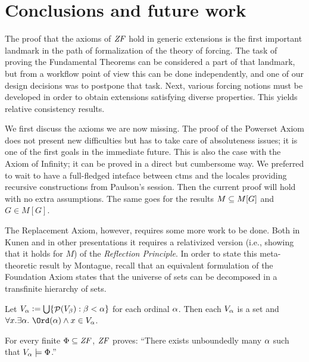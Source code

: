 \section{Conclusions and future work}
\label{sec:conclusions-future-work}

The proof that the axioms of $\mathit{ZF}$ hold in generic extensions is 
the first important landmark in the path of formalization of the
theory of forcing. The task of proving the Fundamental Theorems can be
considered a part of that landmark, but from a workflow point of view
this can be done independently, and one of our design decisions was to
postpone that task.  Next, various forcing notions must be developed
in order to obtain extensions satisfying diverse properties. This
yields relative consistency results.

We first discuss the axioms we are now missing. The proof of the
Powerset Axiom does not present new difficulties but  has to
take care of absoluteness issues; it is one of the
first goals in the immediate future. This is also the case with the
Axiom of Infinity; it can be proved in a direct but cumbersome way. We
preferred to wait to have a full-fledged inteface between ctms and the
locales providing recursive constructions from Paulson's
 session. Then the current proof will hold
with no extra assumptions. The same goes for the results $M\subseteq M[G]$
and $G\in M[G]$.

The Replacement Axiom, however, requires some more work to be
done. Both in Kunen and in other presentations \cite{neeman-course}
it requires a relativized version (i.e., showing that it holds for $M$) of
the \emph{Reflection Principle}. In order to state this meta-theoretic
result by Montague, recall that
an equivalent formulation of the Foundation Axiom states that the 
universe of sets can be decomposed in a transfinite hierarchy of
sets. 
\begin{theorem}
  Let $V_{\alpha}\mathrel{\mathop:}=\mathop{\textstyle\bigcup}\{\mathop{\mathcal{P}}(V_\beta) : \beta<\alpha\}$ for each ordinal
  $\alpha$. Then each $V_\alpha$ is a set and 
  $\forall x. \exists\al .\ \Ord(\al) \y x\in V_\al$.  
\end{theorem}
\begin{theorem}\label{th:reflection-principle}
  For every finite $\Phi\subseteq\mathit{ZF}$, $\mathit{ZF}$ proves: ``There exists
  unboundedly many $\alpha$ such that $V_\alpha\models \Phi$.''
\end{theorem}

